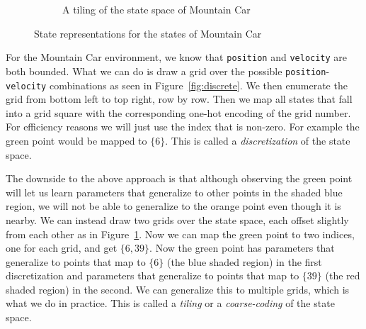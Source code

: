 \documentclass[11pt]{article}
\numberwithin{equation}{section} %
\numberwithin{figure}{section} %
\numberwithin{table}{section} %
\begin{document}
\begin{figure}[H]
\begin{subfigure}{0.5\textwidth}
\caption{A tiling of the state space of Mountain Car}
\label{fig:tiling}
\end{subfigure}

\caption{State representations for the states of Mountain Car}
\label{fig:states}
\end{figure}

For the Mountain Car environment, we know that \texttt{position} and \texttt{velocity} are both bounded. What we can do is draw a grid over the possible \texttt{position}-\texttt{velocity} combinations as seen in Figure~\ref{fig:discrete}. We then enumerate the grid from bottom left to top right, row by row. Then we map all states that fall into a grid square with the corresponding one-hot encoding of the grid number. For efficiency reasons we will just use the index that is non-zero. For example the green point would be mapped to $\{6\}$. This is called a \emph{discretization} of the state space.

The downside to the above approach is that although observing the green point will let us learn parameters that generalize to other points in the shaded blue region, we will not be able to generalize to the orange point even though it is nearby. We can instead draw two grids over the state space, each offset slightly from each other as in Figure~\ref{fig:tiling}. Now we can map the green point to two indices, one for each grid, and get $\{6, 39\}$. Now the green point has parameters that generalize to points that map to $\{6\}$ (the blue shaded region) in the first discretization and parameters that generalize to points that map to $\{39\}$ (the red shaded region) in the second. We can generalize this to multiple grids, which is what we do in practice. This is called a \emph{tiling} or a \emph{coarse-coding} of the state space. 
\end{document}
